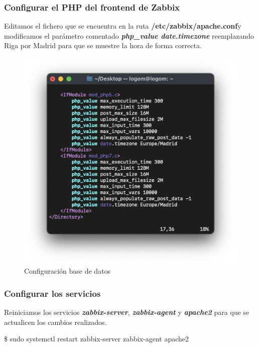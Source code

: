     \subsubsection{Configurar el PHP del frontend de Zabbix}
    Editamos el fichero que se encuentra en la ruta \textbf{/etc/zabbix/apache.conf}y modificamos el parámetro comentado \textbf{\emph{php\_value date.timezone}}
    reemplazando Riga por Madrid para que se muestre la hora de forma correcta.
    \begin{figure}[H]
        \centering
        \includegraphics[scale=0.5]{images/apache_conf.png}
        \caption{Configuración base de datos}
        \label{fig:apache_conf}
    \end{figure}

    \subsubsection{Configurar los servicios}
    Reiniciamos los servicios \textbf{\emph{zabbix-server}}, \textbf{\emph{zabbix-agent}} y \textbf{\emph{apache2}} para que se actualicen los cambios realizados.
        \begin{tcolorbox}[colback=black!10, halign=left]
            \$ sudo systemctl restart zabbix-server zabbix-agent apache2
        \end{tcolorbox}

